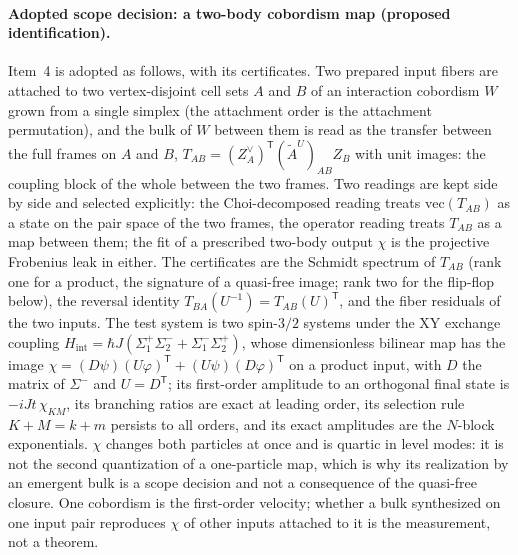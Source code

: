 \documentclass[11pt,letterpaper]{article}
\begin{document}
\paragraph{Adopted scope decision: a two-body cobordism map (proposed
identification).}
Item~4 is adopted as follows, with its certificates. Two prepared input
fibers are attached to two vertex-disjoint cell sets $A$ and $B$ of an
interaction cobordism $W$ grown from a single simplex (the attachment order
is the attachment permutation), and the bulk of $W$ between them is read as
the transfer between the full frames on $A$ and $B$,
$T_{AB}=(Z_A^{\vee})^{\mathsf T}(\tilde A^{U})_{AB}Z_B$ with unit images: the
coupling block of the whole between the two frames. Two readings are kept
side by side and selected explicitly: the Choi-decomposed reading treats
$\mathrm{vec}(T_{AB})$ as a state on the pair space of the two frames, the
operator reading treats $T_{AB}$ as a map between them; the fit of a
prescribed two-body output $\chi$ is the projective Frobenius leak in either.
The certificates are the Schmidt spectrum of $T_{AB}$ (rank one for a product,
the signature of a quasi-free image; rank two for the flip-flop below), the
reversal identity $T_{BA}(U^{-1})=T_{AB}(U)^{\mathsf T}$, and the fiber
residuals of the two inputs. The test system is two spin-$3/2$ systems under
the XY exchange coupling $H_{\mathrm{int}}=\hbar J(\Sigma_1^{+}\Sigma_2^{-}
+\Sigma_1^{-}\Sigma_2^{+})$, whose dimensionless bilinear map has the image
$\chi=(D\psi)(U\varphi)^{\mathsf T}+(U\psi)(D\varphi)^{\mathsf T}$ on a
product input, with $D$ the matrix of $\Sigma^{-}$ and $U=D^{\mathsf T}$; its
first-order amplitude to an orthogonal final state is $-iJt\,\chi_{KM}$, its
branching ratios are exact at leading order, its selection rule $K+M=k+m$
persists to all orders, and its exact amplitudes are the $N$-block
exponentials. $\chi$ changes both particles at once and is quartic in level
modes: it is not the second quantization of a one-particle map, which is why
its realization by an emergent bulk is a scope decision and not a consequence
of the quasi-free closure. One cobordism is the first-order velocity; whether
a bulk synthesized on one input pair reproduces $\chi$ of other inputs
attached to it is the measurement, not a theorem.
\end{document}
